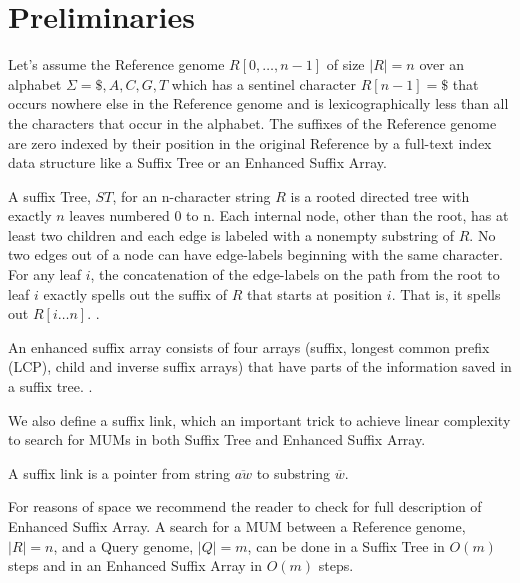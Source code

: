 \documentclass[runningheads,a4paper]{llncs}
\begin{document}
\section{Preliminaries}
Let's assume the Reference genome $R[0,\ldots, n-1]$ of size $|R|=n$ over an alphabet $\Sigma={ \$, A, C, G, T}$ which has a sentinel character $R[n-1] = \$$ that occurs nowhere else in the Reference genome and is lexicographically less than all the characters that occur in the alphabet. The suffixes of the Reference genome are zero indexed by their position in the original Reference by a full-text index data structure like a Suffix Tree or an Enhanced Suffix Array. 
\begin{definition}
A suffix Tree, $ST$, for an n-character string $R$ is a rooted directed tree with exactly $n$ leaves numbered 0 to n. Each internal node, other than the root, has at least two children and each edge is labeled with a nonempty substring of $R$. No two edges out of a node can have edge-labels beginning with the same character. For any leaf $i$, the concatenation of the edge-labels on the path from the root to leaf $i$ exactly spells out the suffix of $R$ that starts at position $i$. That is, it spells out $R[i\ldots n]$. \cite{Gusfield1997}.
\end{definition}
\begin{definition}
  An enhanced suffix array consists of four arrays (suffix, longest common prefix (LCP), child and inverse suffix arrays) that have parts of the information saved in a suffix tree. \cite{Abouelhoda2004}.
\end{definition}
We also define a suffix link, which an important trick to achieve linear complexity to search for MUMs in both Suffix Tree and Enhanced Suffix Array.
\begin{definition}
A suffix link is a pointer from string $\overline{aw}$ to substring $\overline{w}$.
\end{definition}
For reasons of space we recommend the reader to check \cite{Abouelhoda2004} for full description of Enhanced Suffix Array.
A search for a MUM between a Reference genome, $|R|=n$, and a Query genome, $|Q|=m$,  can be done in a Suffix Tree in $O(m)$ steps and in an Enhanced Suffix Array in $O(m)$ steps.
\end{document}
